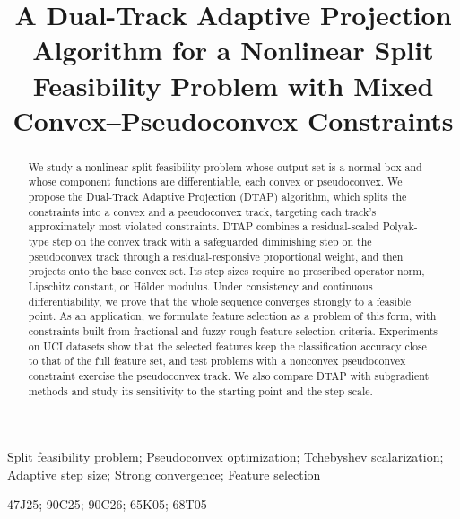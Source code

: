 \documentclass[]{interact}
\theoremstyle{plain}
\theoremstyle{definition}
\theoremstyle{remark}
\begin{document}
\title{A Dual-Track Adaptive Projection Algorithm for a Nonlinear Split Feasibility Problem with Mixed Convex--Pseudoconvex Constraints}

\author{
}

\maketitle

\begin{abstract}
We study a nonlinear split feasibility problem whose output set is a normal box and whose component functions are differentiable, each convex or pseudoconvex. We propose the Dual-Track Adaptive Projection (DTAP) algorithm, which splits the constraints into a convex and a pseudoconvex track, targeting each track's approximately most violated constraints. DTAP combines a residual-scaled Polyak-type step on the convex track with a safeguarded diminishing step on the pseudoconvex track through a residual-responsive proportional weight, and then projects onto the base convex set. Its step sizes require no prescribed operator norm, Lipschitz constant, or H\"older modulus. Under consistency and continuous differentiability, we prove that the whole sequence converges strongly to a feasible point. As an application, we formulate feature selection as a problem of this form, with constraints built from fractional and fuzzy-rough feature-selection criteria. Experiments on UCI datasets show that the selected features keep the classification accuracy close to that of the full feature set, and test problems with a nonconvex pseudoconvex constraint exercise the pseudoconvex track. We also compare DTAP with subgradient methods and study its sensitivity to the starting point and the step scale.
\end{abstract}

\begin{keywords}
Split feasibility problem; Pseudoconvex optimization; Tchebyshev scalarization; Adaptive step size; Strong convergence; Feature selection
\end{keywords}
\begin{amscode}
47J25; 90C25; 90C26; 65K05; 68T05
\end{amscode}
\end{document}
